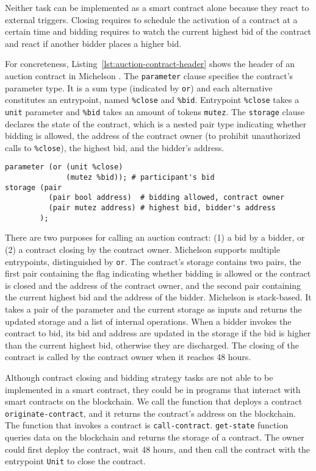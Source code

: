 \documentclass[a4paper]{llncs}
\begin{document}
Neither task can be implemented as a smart contract alone because they react
to external triggers. Closing requires to schedule the activation of a
contract at a certain time and bidding 
requires to watch the current highest bid of the contract and
react if another bidder places a higher bid.

For concreteness, Listing~\ref{lst:auction-contract-header} shows the
header of an auction contract in Michelson \cite{michelson}. The
\lstinline/parameter/ clause specifies the contract's parameter
type. It is a sum type (indicated by \lstinline/or/) and each
alternative constitutes an entrypoint, named \lstinline/%close/ and
\lstinline/%bid/. Entrypoint \lstinline/%close/ takes a \texttt{unit}
parameter and \lstinline/%bid/ takes an amount of tokens \texttt{mutez}.
The \lstinline/storage/ clause declares the state of the contract,
which is a nested pair type indicating whether bidding is allowed, the address of the
contract owner (to prohibit unauthorized calls to \lstinline/%close/),
the highest bid, and the bidder's address.
\begin{lstlisting}[numbers=none,float,caption={Header of the auction contract},label={lst:auction-contract-header},captionpos=b,emph={close,bid},emphstyle=\underbar]
parameter (or (unit %close)
              (mutez %bid)); # participant's bid
storage (pair
          (pair bool address)  # bidding allowed, contract owner
          (pair mutez address) # highest bid, bidder's address
        );
\end{lstlisting}


There are two purposes for calling an auction contract: (1) a bid by a bidder, or (2) a contract closing by the contract owner. Michelson supports multiple entrypoints, distinguished by \texttt{or}. The contract's storage contains two pairs, the first pair containing the flag indicating whether bidding is allowed or the contract is closed and the address of the contract owner, and the second pair containing the current highest bid and the address of the bidder. Michelson is stack-based. It takes a pair of the parameter and the current storage as inputs and returns the updated storage and a list of internal operations. When a bidder invokes the contract to bid, its bid and address are updated in the storage if the bid is higher than the current highest bid, otherwise they are discharged. The closing of the contract is called by the contract owner when it reaches 48 hours.




Although contract closing  and bidding strategy tasks are not able to be implemented in a smart contract, they could be in programs that interact with smart contracts on the blockchain. We call the function that deploys a contract \texttt{originate-contract}, and  it returns the contract's address on the blockchain.  The function that invokes a contract is \texttt{call-contract}. \texttt{get-state} function queries data on the blockchain and returns the storage of a contract. The owner could first deploy the contract, wait 48 hours, and then call the contract with the entrypoint \texttt{Unit} to close the contract.
\end{document}

